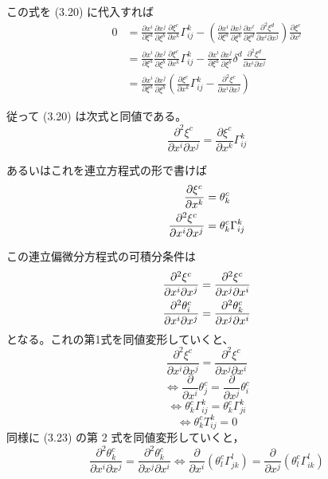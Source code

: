 \documentclass[a4paper,11pt]{jsarticle}
\numberwithin{equation}{section}
\begin{document}
    この式を (3.20) に代入すれば
    \begin{align}
    0 &= \frac{\partial x^i}{\partial \xi^a} \frac{\partial x^j}{\partial \xi^b} \frac{\partial \xi^c}{\partial x^k} \Gamma^k_{ij} - \left( \frac{\partial x^i}{\partial \xi^a} \frac{\partial x^j}{\partial \xi^b} \frac{\partial x^\ell}{\partial \xi^d} \frac{\partial^2 \xi^d}{\partial x^i \partial x^j} \right) \frac{\partial \xi^c}{\partial x^\ell} \\
    &= \frac{\partial x^i}{\partial \xi^a} \frac{\partial x^j}{\partial \xi^b} \frac{\partial \xi^c}{\partial x^k} \Gamma^k_{ij} - \frac{\partial x^i}{\partial \xi^a} \frac{\partial x^j}{\partial \xi^b} \delta^d \frac{\partial^2 \xi^d}{\partial x^i \partial x^j} \\
    &= \frac{\partial x^i}{\partial \xi^a} \frac{\partial x^j}{\partial \xi^b} \left( \frac{\partial \xi^c}{\partial x^k} \Gamma^k_{ij} - \frac{\partial^2 \xi^c}{\partial x^i \partial x^j} \right)
    \end{align}
    
    従って (3.20) は次式と同値である。
    \begin{equation}
    \frac{\partial^2 \xi^c}{\partial x^i \partial x^j} = \frac{\partial \xi^c}{\partial x^k} \Gamma^k_{ij}
    \end{equation}
    
    あるいはこれを連立方程式の形で書けば
    \begin{align}
        \frac{\partial \xi^c}{\partial x^k} &= \theta^c_k \\
        \pdv{\xi^c}{x^i}{x^j} &= \theta^c_k \Gamma^k_{ij}
    \end{align}

この連立偏微分方程式の可積分条件は
    \begin{align}
        \pdv[2]{\xi^c}{x^i}{x^j} &= \pdv[2]{\xi^c}{x^j}{x^i} \\
        \pdv[2]{\theta^c_i}{x^i}{x^j} &= \pdv[2]{\theta^c_k}{x^j}{x^i}
    \end{align}
となる。これの第1式を同値変形していくと、
\begin{equation}
    \frac{\partial^2 \xi^c}{\partial x^i \partial x^j} = \frac{\partial^2 \xi^c}{\partial x^j \partial x^i}
\end{equation}
\begin{equation}
    \Leftrightarrow \frac{\partial}{\partial x^i} \theta^c_j = \frac{\partial}{\partial x^j} \theta^c_i
\end{equation}
\begin{equation}
    \Leftrightarrow \theta^c_k \Gamma^k_{ij} = \theta^c_k \Gamma^k_{ji}
\end{equation}
\begin{equation}
    \Leftrightarrow \theta^c_k T^k_{ij} = 0
\end{equation}
同様に (3.23) の第 2 式を同値変形していくと，
\begin{equation}
    \frac{\partial^2 \theta^c_k}{\partial x^i \partial x^j} = \frac{\partial^2 \theta^c_k}{\partial x^j \partial x^i} \iff \frac{\partial}{\partial x^i} (\theta^c_l \Gamma^l_{jk}) = \frac{\partial}{\partial x^j} (\theta^c_l \Gamma^l_{ik})
\end{equation}
\end{document}
